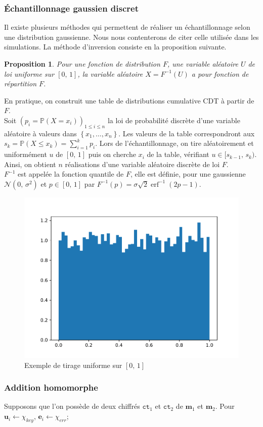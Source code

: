 \documentclass[11pt, headsepline, a4paper, fleqn, oneside]{article}
\newtheorem{prop}{Proposition}
\begin{document}
\subsubsection{Échantillonnage gaussien discret}
Il existe plusieurs méthodes qui permettent de réaliser un échantillonnage selon une distribution gaussienne. Nous nous contenterons de citer celle utilisée dans les simulations. La méthode d'inversion consiste en la proposition suivante.
\begin{prop}
Pour une fonction de distribution $F$, une variable aléatoire $U$ de loi uniforme sur $[0,\,1]$, la variable aléatoire $X = F^{-1} (U)$ a pour fonction de répartition $F$.
\end{prop}
En pratique, on construit une table de distributions cumulative CDT à partir de $F$.\\
Soit $\left(p_{i}=\mathbb{P}\left(X=x_{i}\right)\right)_{1 \leq i \leq n}$ la loi de probabilité discrète d’une variable aléatoire à valeurs dans $\left\{x_{1}, \dots, x_{n}\right\}$. Les valeurs de la table correspondront aux $s_{k}=\mathbb{P}\left(X \leq x_{k}\right)=\sum_{i=1}^{k} p_{i}$. Lors de l'échantillonnage, on tire aléatoirement et uniformément $u$ de $[0,\,1]$ puis on cherche $x_i$ de la table, vérifiant $u\in[s_{k-1},\,s_k )$. Ainsi, on obtient $n$ réalisations d’une variable aléatoire discrète de loi $F$.\\
$F^{-1}$ est appelée la fonction quantile de $F$, elle est définie, pour une gaussienne $\mathcal{N}(0,\,\sigma^2)$ et $p\in[0,\,1]$ par $F^{-1}(p) = \sigma \sqrt{2} \operatorname{erf}^{-1}(2 p-1)$.
\begin{figure}[ht]
    \centering
    \includegraphics[width=0.4\linewidth]{sample_unif.pdf}
    \caption{Exemple de tirage uniforme sur $[0,\,1]$}
\end{figure}
\subsubsection{Addition homomorphe}\label{3.2.2} Supposons que l'on possède de deux chiffrés $\texttt{ct}_1$ et $\texttt{ct}_2$ de $\boldsymbol{m}_1$ et $\boldsymbol{m}_2$. Pour $\boldsymbol{u}_i \leftarrow \chi_{key}$, $\boldsymbol{e}_{i} \leftarrow \chi_{err}$;
\end{document}
